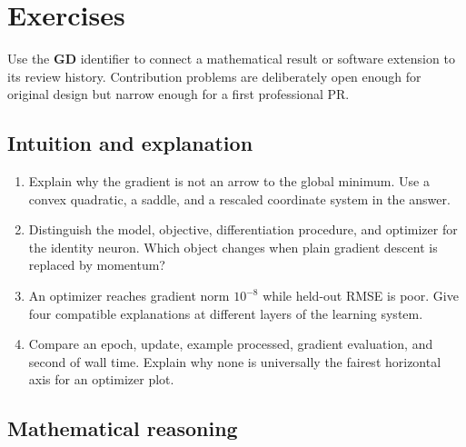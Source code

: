 \section{Exercises}

Use the \textbf{GD} identifier to connect a mathematical result or software
extension to its review history. Contribution problems are deliberately open
enough for original design but narrow enough for a first professional PR.

\subsection*{Intuition and explanation}

\begin{enumerate}[label=\textbf{GD-I\arabic*.},leftmargin=*,itemsep=0.65em]
  \item Explain why the gradient is not an arrow to the global minimum. Use a
  convex quadratic, a saddle, and a rescaled coordinate system in the answer.
  \item Distinguish the model, objective, differentiation procedure, and
  optimizer for the identity neuron. Which object changes when plain gradient
  descent is replaced by momentum?
  \item An optimizer reaches gradient norm $10^{-8}$ while held-out RMSE is
  poor. Give four compatible explanations at different layers of the learning
  system.
  \item Compare an epoch, update, example processed, gradient evaluation, and
  second of wall time. Explain why none is universally the fairest horizontal
  axis for an optimizer plot.
\end{enumerate}

\subsection*{Mathematical reasoning}

